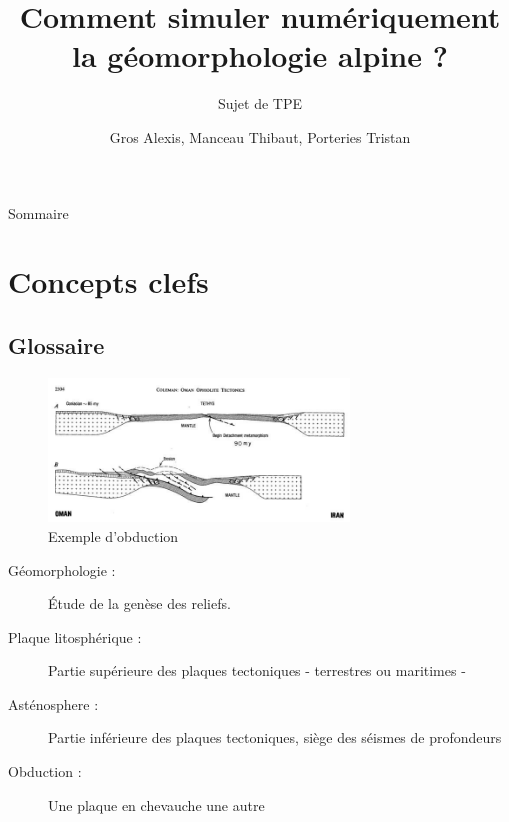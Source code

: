 \documentclass{beamer}
\title{Comment simuler numériquement la géomorphologie alpine ?}
\subtitle{Sujet de TPE}
\author{Gros Alexis, Manceau Thibaut, Porteries Tristan}
\begin{document}
\frame{\titlepage}
\begin{frame}{Sommaire}
  \begin{multicols}{2}
    \small \tableofcontents
  \end{multicols}
\end{frame}

\section{Concepts clefs}

\subsection{Glossaire}
\begin{frame}
 \begin{center}
	\begin{figure}
	 \includegraphics[width=8cm]{Images/Images_Alexis/image007.jpg}
	 \caption{Exemple d'obduction}
	\end{figure}
		\begin{description}
		 \item[Géomorphologie :] Étude de la genèse des reliefs.
		 \item[Plaque litosphérique :] Partie supérieure des plaques tectoniques - terrestres ou maritimes -
		 \item[Asténosphere :] Partie inférieure des plaques tectoniques, siège des séismes de profondeurs
		 \item[Obduction :] Une plaque en chevauche une autre
		\end{description}
 \end{center}
\end{frame}
 
\end{document}
